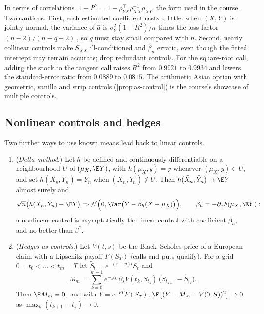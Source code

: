 In terms of correlations, $1-R^2=1-\rho_{YX}^\top\rho_{XX}^{-1}\rho_{XY}$, the form used in the
course. Two cautions. First, each estimated coefficient costs a little: when $(X,Y)$ is
jointly normal, the variance of $\hat a$ is $\sigma_Y^2(1-R^2)/n$ times the loss factor
$(n-2)/(n-q-2)$ \citep{lavenberg-moeller-welch}, so $q$ must stay small compared with $n$.
Second, nearly collinear controls make $S_{XX}$ ill-conditioned and $\hat\beta_n$ erratic, even
though the fitted intercept may remain accurate; drop redundant controls. For the
square-root call, adding the stock to the tangent call raises $R^2$ from $0.9921$ to $0.9934$
and lowers the standard-error ratio from $0.0889$ to $0.0815$. The arithmetic Asian option with
geometric, vanilla and strip controls (\cref{prop:as-control}) is the course's showcase of
multiple controls.

\subsection{Nonlinear controls and hedges}

Two further ways to use known means lead back to linear controls.

\begin{proposition}\label{prop:cv-nonlinear}
\begin{enumerate}[label=(\roman*)]
  \item (\emph{Delta method}.) Let $h$ be defined and continuously differentiable on a
    neighbourhood $U$ of $(\mu_X,\E Y)$, with $h(\mu_X,y)=y$ whenever $(\mu_X,y)\in U$, and set
    $h(\bar X_n,\bar Y_n)=\bar Y_n$ when $(\bar X_n,\bar Y_n)\notin U$. Then $h(\bar X_n,\bar Y_n)\to\E Y$ almost
    surely and
    \[
      \sqrt n\big(h(\bar X_n,\bar Y_n)-\E Y\big)\Rightarrow
      \mathcal N\Big(0,\Var\big(Y-\beta_h(X-\mu_X)\big)\Big),\qquad
      \beta_h=-\partial_xh(\mu_X,\E Y):
    \]
    a nonlinear control is asymptotically the linear control with coefficient $\beta_h$, and
    no better than $\beta^*$.
  \item (\emph{Hedges as controls}.) Let $V(t,s)$ be the Black--Scholes price of a European
    claim with a Lipschitz payoff $F(S_T)$ (calls and puts qualify). For a grid
    $0=t_0<\dots<t_m=T$ let $\tilde S_t=e^{-(r-y)t}S_t$ and
    \[
      M_m=\sum_{k=0}^{m-1}e^{-yt_k}\,\partial_sV(t_k,S_{t_k})\,\big(\tilde S_{t_{k+1}}-\tilde S_{t_k}\big).
    \]
    Then $\E M_m=0$, and with $Y=e^{-rT}F(S_T)$,
    $\E\big[(Y-M_m-V(0,S))^2\big]\to0$ as $\max_k(t_{k+1}-t_k)\to0$.
\end{enumerate}
\end{proposition}


